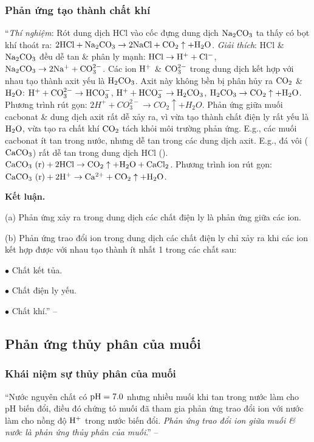 \documentclass[oneside]{book}
\numberwithin{equation}{section}
\begin{document}
\subsubsection{Phản ứng tạo thành chất khí}
``\textit{Thí nghiệm}: Rót dung dịch HCl vào cốc đựng dung dịch $\rm Na_2CO_3$ ta thấy có bọt khí thoát ra: $\rm 2HCl + Na_2CO_3\to 2NaCl + CO_2\uparrow + H_2O$. \textit{Giải thích}: HCl \& $\rm Na_2CO_3$ đều dễ tan \& phân ly mạnh: $\rm HCl\to H^+ + Cl^-$, $\rm Na_2CO_3\to 2Na^+ + CO_3^{2-}$. Các ion $\rm H^+$ \& $\rm CO_3^{2-}$ trong dung dịch kết hợp với nhau tạo thành axit yếu là $\rm H_2CO_3$. Axit này không bền bị phân hủy ra $\rm CO_2$ \& $\rm H_2O$: $\rm H^+ + CO_3^{2-}\to HCO_3^-$, $\rm H^+ + HCO_3^-\to H_2CO_3$, $\rm H_2CO_3\to CO_2\uparrow + H_2O$. Phương trình rút gọn: $2H^+ + CO_3^{2-}\to CO_2\uparrow + H_2O$. Phản ứng giữa muối cacbonat \& dung dịch axit rất dễ xảy ra, vì vừa tạo thành chất điện ly rất yếu là $\rm H_2O$, vừa tạo ra chất khí $\rm CO_2$ tách khỏi môi trường phản ứng. E.g., các muối cacbonat ít tan trong nước, nhưng dễ tan trong các dung dịch axit. E.g., đá vôi ($\rm CaCO_3$) rất dễ tan trong dung dịch HCl (\cite[Hình 1.8: \textsf{Phản ứng tạo thành chất khí $\rm CO_2$}, p. 26]{SGK_Hoa_Hoc_11_nang_cao}). $\rm CaCO_3\ (r) + 2HCl\to CO_2\uparrow + H_2O + CaCl_2$. Phương trình ion rút gọn: $\rm CaCO_3\ (r) + 2H^+\to Ca^{2+} + CO_2\uparrow + H_2O$.

\noindent\textbf{Kết luận.}
\begin{enumerate*}
	\item[(a)] Phản ứng xảy ra trong dung dịch các chất điện ly là phản ứng giữa các ion.
	\item[(b)] Phản ứng trao đổi ion trong dung dịch các chất điện ly chỉ xảy ra khi các ion kết hợp được với nhau tạo thành ít nhất 1 trong các chất sau:
	\begin{enumerate*}
		\item[$\bullet$] Chất kết tủa.
		\item[$\bullet$] Chất điện ly yếu.
		\item[$\bullet$] Chất khí.'' -- \cite[pp. 26--27]{SGK_Hoa_Hoc_11_nang_cao}
	\end{enumerate*}
\end{enumerate*}

\subsection{Phản ứng thủy phân của muối}

\subsubsection{Khái niệm sự thủy phân của muối}
``Nước nguyên chất có $\rm pH = 7.0$ nhưng nhiều muối khi tan trong nước làm cho pH biến đổi, điều đó chứng tỏ muối đã tham gia phản ứng trao đổi ion với nước làm cho nồng độ $\rm H^+$ trong nước biến đổi. \textit{Phản ứng trao đổi ion giữa muối \& nước là phản ứng thủy phân của muối}.'' -- \cite[p. 27]{SGK_Hoa_Hoc_11_nang_cao}
\end{document}
